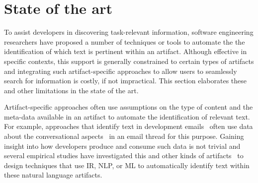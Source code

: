 \section{State of the art}
\label{cp1:novelty}






To assist developers in discovering task-relevant information,
software engineering researchers have proposed 
a number of techniques or tools 
to automate the the identification of which text is pertinent within an
artifact.
Although effective in specific contexts, this support is generally constrained 
to certain
types of artifacts and integrating such artifact-specific
approaches to allow users to seamlessly search
for information is costly, if not impractical. This section
elaborates these and other limitations in the state of the art.

    




Artifact-specific approaches often use assumptions on the type of content 
and the meta-data available in an artifact
to automate the identification of relevant text.
For example, approaches that identify text in development emails~\cite{Sorbo2015} often use 
data about the conversational aspects~\cite{Murray2008} in an email thread for this purpose.  
Gaining insight into how developers produce and consume 
such data is not trivial and several empirical studies have investigated 
this and other kinds of artifacts~\cite{panichella2012, Ko2006, Arya2019, Maalej2013} 
to design techniques that use \acf{IR}, \acf{NLP}, or \acf{ML} 
to automatically identify
text within these natural language 
artifacts.


